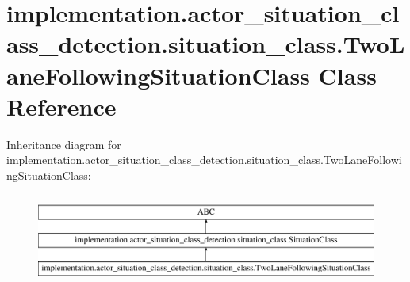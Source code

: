 \hypertarget{classimplementation_1_1actor__situation__class__detection_1_1situation__class_1_1_two_lane_following_situation_class}{}\section{implementation.\+actor\+\_\+situation\+\_\+class\+\_\+detection.\+situation\+\_\+class.\+Two\+Lane\+Following\+Situation\+Class Class Reference}
\label{classimplementation_1_1actor__situation__class__detection_1_1situation__class_1_1_two_lane_following_situation_class}
Inheritance diagram for implementation.\+actor\+\_\+situation\+\_\+class\+\_\+detection.\+situation\+\_\+class.\+Two\+Lane\+Following\+Situation\+Class\+:\begin{figure}[H]
\begin{center}
\leavevmode
\includegraphics[height=3.000000cm]{classimplementation_1_1actor__situation__class__detection_1_1situation__class_1_1_two_lane_following_situation_class}
\end{center}
\end{figure}
